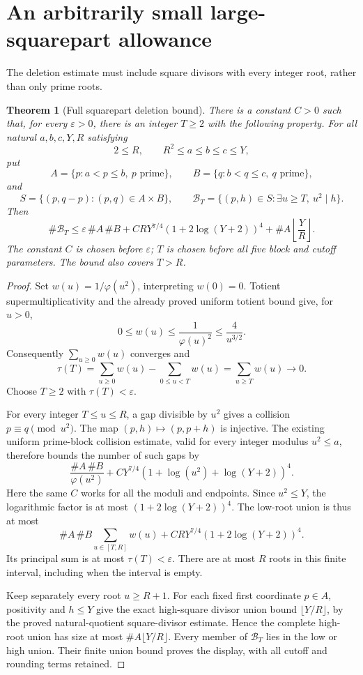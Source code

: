 \documentclass[11pt]{article}
\newtheorem{theorem}{Theorem}[section]
\begin{document}
\section{An arbitrarily small large-squarepart allowance}
\label{sec:native-large-squarepart}

The deletion estimate must include square divisors with every integer
root, rather than only prime roots.

\begin{theorem}[Full squarepart deletion bound]
\label{thm:native-large-squarepart}
There is a constant \(C>0\) such that, for every
\(\varepsilon>0\), there is an integer \(T\ge2\) with the following
property. For all natural \(a,b,c,Y,R\) satisfying
\[
 2\le R,\qquad R^2\le a\le b\le c\le Y,
\]
put
\[
 A=\{p:a<p\le b,\ p\text{ prime}\},\qquad
 B=\{q:b<q\le c,\ q\text{ prime}\},
\]
and
\[
 S=\{(p,q-p):(p,q)\in A\times B\},\qquad
 \mathcal B_T=\{(p,h)\in S:\exists u\ge T,\ u^2\mid h\}.
\]
Then
\[
 \#\mathcal B_T\le
 \varepsilon\,\#A\,\#B+
 CRY^{7/4}(1+2\log(Y+2))^4+
 \#A\left\lfloor\frac YR\right\rfloor.
\]
The constant \(C\) is chosen before \(\varepsilon\); \(T\) is
chosen before all five block and cutoff parameters.
The bound also covers \(T>R\).
\end{theorem}

\begin{proof}
Set \(w(u)=1/\varphi(u^2)\), interpreting \(w(0)=0\).
Totient supermultiplicativity and the already proved uniform
totient bound give, for \(u>0\),
\[
 0\le w(u)\le\frac1{\varphi(u)^2}\le\frac4{u^{3/2}}.
\]
Consequently \(\sum_{u\ge0}w(u)\) converges and
\[
 \tau(T)=\sum_{u\ge0}w(u)-\sum_{0\le u<T}w(u)
        =\sum_{u\ge T}w(u)\longrightarrow0.
\]
Choose \(T\ge2\) with \(\tau(T)<\varepsilon\).

For every integer \(T\le u\le R\), a gap divisible by \(u^2\)
gives a collision \(p\equiv q\pmod{u^2}\).
The map \((p,h)\mapsto(p,p+h)\) is injective.
The existing uniform prime-block collision estimate, valid for
every integer modulus \(u^2\le a\), therefore bounds the number
of such gaps by
\[
 \frac{\#A\,\#B}{\varphi(u^2)}
   +CY^{7/4}
       (1+\log(u^2)+\log(Y+2))^4.
\]
Here the same \(C\) works for all the moduli and endpoints.
Since \(u^2\le Y\), the logarithmic factor is at most
\((1+2\log(Y+2))^4\).
The low-root union is thus at most
\[
 \#A\,\#B\sum_{u\in[T,R]}w(u)
   +CRY^{7/4}(1+2\log(Y+2))^4.
\]
Its principal sum is at most \(\tau(T)<\varepsilon\).
There are at most \(R\) roots in this finite interval,
including when the interval is empty.

Keep separately every root \(u\ge R+1\).
For each fixed first coordinate \(p\in A\), positivity and
\(h\le Y\) give the exact high-square divisor union bound
\(\lfloor Y/R\rfloor\), by the proved natural-quotient
square-divisor estimate. Hence the complete high-root union
has size at most \(\#A\lfloor Y/R\rfloor\).
Every member of \(\mathcal B_T\) lies in the low or high union.
Their finite union bound proves the display, with all cutoff
and rounding terms retained.
\end{proof}
\end{document}
